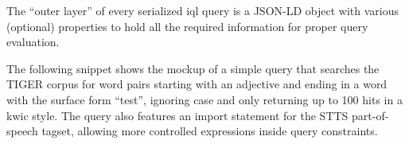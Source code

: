\documentclass[11pt,a4paper]{article}
\begin{document}
The ``outer layer'' of every serialized \ac{iql} query is a JSON-LD object with various (optional) properties to hold all the required information for proper query evaluation.

The following snippet shows the mockup of a simple query that searches the TIGER corpus for word pairs starting with an adjective and ending in a word with the surface form ``test'', ignoring case and only returning up to 100 hits in a \ac{kwic} style. 
The query also features an import statement for the STTS part-of-speech tagset, allowing more controlled expressions inside query constraints.
\medskip




\end{document}
